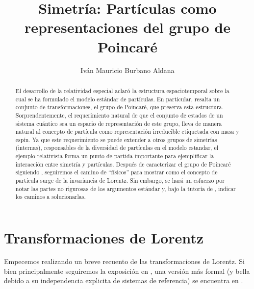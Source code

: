 \documentclass[11pt]{article}
\title{Simetría: Partículas como representaciones del grupo de Poincaré}
\author{Iván Mauricio Burbano Aldana}
\affil{Universidad de los Andes}
\begin{document}
\maketitle

\begin{abstract}
El desarrollo de la relatividad especial aclaró la estructura espaciotemporal sobre la cual se ha formulado el modelo estándar de partículas. En particular, resalta un conjunto de transformaciones, el grupo de Poincaré, que preserva esta estructura. Sorprendentemente, el requerimiento natural de que el conjunto de estados de un sistema cuántico sea un espacio de representación de este grupo, lleva de manera natural al concepto de partícula como representación irreducible etiquetada con masa y espín\cite{Wigner1939}. Ya que este requerimiento se puede extender a otros grupos de simetrías (internas), responsables de la diversidad de partículas en el modelo estandar, el ejemplo relativista forma un punto de partida importante para ejemplificar la interacción entre simetría y partículas. Después de caracterizar el grupo de Poincaré siguiendo \cite{Scheck2010}, seguiremos el camino de ``físicos''\cite{Haag1992}\cite{Weinberg1995} para mostrar como el concepto de partícula surge de la invariancia de Lorentz. Sin embargo, se hará un esfuerzo por notar las partes no rigurosas de los argumentos estándar y, bajo la tutoría de \cite{Straumann2008}, indicar los caminos a solucionarlas.  
\end{abstract}

\section{Transformaciones de Lorentz}

Empecemos realizando un breve recuento de las transformaciones de Lorentz. Si bien principalmente seguiremos la exposición en \cite{Scheck2010}, una versión más formal (y bella debido a su independencia explicita de sistemas de referencia) se encuentra en \cite{Matolcsi1993}.
\end{document}
